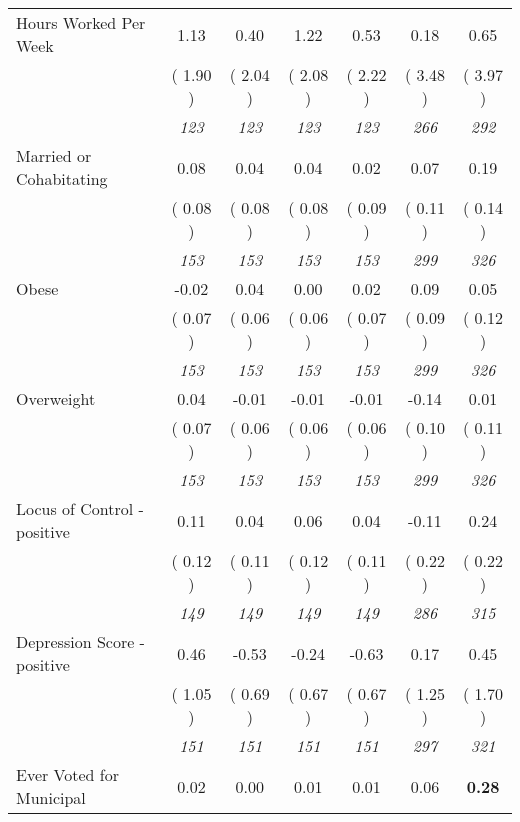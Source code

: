 \begin{tabular}{l c c c c c c}
Hours Worked Per Week &      1.13 &      0.40 &      1.22 &      0.53 &      0.18 &      0.65 \\
& (     1.90 ) & (     2.04 ) & (     2.08 ) & (     2.22 ) & (     3.48 ) & (     3.97 ) \\
& \textit{ 123 } & \textit{ 123 } & \textit{ 123 } & \textit{ 123 } & \textit{ 266 } & \textit{ 292 } \\
Married or Cohabitating &      0.08 &      0.04 &      0.04 &      0.02 &      0.07 &      0.19 \\
& (     0.08 ) & (     0.08 ) & (     0.08 ) & (     0.09 ) & (     0.11 ) & (     0.14 ) \\
& \textit{ 153 } & \textit{ 153 } & \textit{ 153 } & \textit{ 153 } & \textit{ 299 } & \textit{ 326 } \\
Obese &     -0.02 &      0.04 &      0.00 &      0.02 &      0.09 &      0.05 \\
& (     0.07 ) & (     0.06 ) & (     0.06 ) & (     0.07 ) & (     0.09 ) & (     0.12 ) \\
& \textit{ 153 } & \textit{ 153 } & \textit{ 153 } & \textit{ 153 } & \textit{ 299 } & \textit{ 326 } \\
Overweight &      0.04 &     -0.01 &     -0.01 &     -0.01 &     -0.14 &      0.01 \\
& (     0.07 ) & (     0.06 ) & (     0.06 ) & (     0.06 ) & (     0.10 ) & (     0.11 ) \\
& \textit{ 153 } & \textit{ 153 } & \textit{ 153 } & \textit{ 153 } & \textit{ 299 } & \textit{ 326 } \\
Locus of Control - positive &      0.11 &      0.04 &      0.06 &      0.04 &     -0.11 &      0.24 \\
& (     0.12 ) & (     0.11 ) & (     0.12 ) & (     0.11 ) & (     0.22 ) & (     0.22 ) \\
& \textit{ 149 } & \textit{ 149 } & \textit{ 149 } & \textit{ 149 } & \textit{ 286 } & \textit{ 315 } \\
Depression Score - positive &      0.46 &     -0.53 &     -0.24 &     -0.63 &      0.17 &      0.45 \\
& (     1.05 ) & (     0.69 ) & (     0.67 ) & (     0.67 ) & (     1.25 ) & (     1.70 ) \\
& \textit{ 151 } & \textit{ 151 } & \textit{ 151 } & \textit{ 151 } & \textit{ 297 } & \textit{ 321 } \\
Ever Voted for Municipal &      0.02 &      0.00 &      0.01 &      0.01 &      0.06 & \textbf{      0.28 } \\

\end{tabular}
